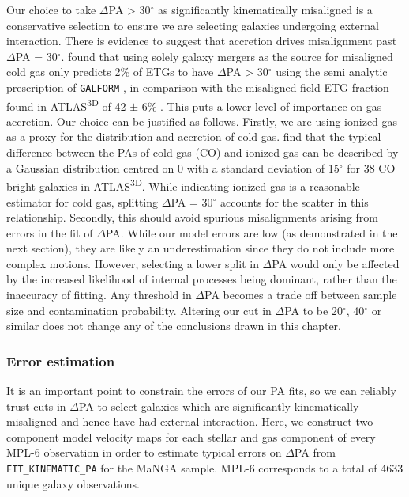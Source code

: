 Our choice to take $\Delta$PA > 30$^{\circ}$ as significantly kinematically misaligned is a conservative selection to ensure we are selecting galaxies undergoing external interaction. There is evidence to suggest that accretion drives misalignment past $\Delta$PA = 30$^{\circ}$. \citet{lagos2015} found that using solely galaxy mergers as the source for misaligned cold gas only predicts 2\% of ETGs to have $\Delta$PA > 30$^{\circ}$ using the semi analytic prescription of \texttt{GALFORM} \citep{galform}, in comparison with the misaligned field ETG fraction found in ATLAS\textsuperscript{3D} of 42 $\pm$ 6\%  \citep{davis2011a}. This puts a lower level of importance on gas accretion. Our choice can be justified as follows. Firstly, we are using ionized gas as a proxy for the distribution and accretion of cold gas. \citet{davis2011a} find that the typical difference between the PAs of cold gas (CO) and ionized gas can be described by a Gaussian distribution centred on 0 with a standard deviation of 15$^{\circ}$ for 38 CO bright galaxies in ATLAS\textsuperscript{3D}. While indicating ionized gas is a reasonable estimator for cold gas, splitting $\Delta$PA = 30$^{\circ}$ accounts for the scatter in this relationship. Secondly, this should avoid spurious misalignments arising from errors in the fit of $\Delta$PA. While our model errors are low (as demonstrated in the next section), they are likely an underestimation since they do not include more complex motions. However, selecting a lower split in $\Delta$PA would only be affected by the increased likelihood of internal processes being dominant, rather than the inaccuracy of fitting. Any threshold in $\Delta$PA becomes a trade off between sample size and contamination probability. Altering our cut in $\Delta$PA to be 20$^{\circ}$, 40$^{\circ}$ or similar does not change any of the conclusions drawn in this chapter.

\subsubsection{Error estimation}
It is an important point to constrain the errors of our PA fits, so we can reliably trust cuts in $\Delta$PA to select galaxies which are significantly kinematically misaligned and hence have had external interaction. Here, we construct two component model velocity maps for each stellar and gas component of every MPL-6 observation in order to estimate typical errors on $\Delta$PA from \texttt{FIT\_KINEMATIC\_PA} for the MaNGA sample. MPL-6 corresponds to a total of 4633 unique galaxy observations.

